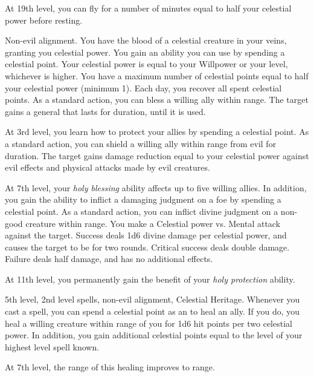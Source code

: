     At 19th level, you can fly for a number of minutes equal to half your celestial power before resting.

    \featpres Non-evil alignment.
    \featben You have the blood of a celestial creature in your veins, granting you celestial power.
    You gain an ability you can use by spending a celestial point.
    Your celestial power is equal to your Willpower or your level, whichever is higher.
    You have a maximum number of celestial points equal to half your celestial power (minimum 1).
    Each day, you recover all spent celestial points.
     As a standard action, you can bless a willing ally within \rngclose range. The target gains a general  that lasts for \durshort duration, until it is used.

    At 3rd level, you learn how to protect your allies by spending a celestial point.
     As a standard action, you can shield a willing ally within \rngmed range from evil for \durshort duration. The target gains damage reduction equal to your celestial power against evil effects and physical attacks made by evil creatures.

    At 7th level, your \textit{holy blessing} ability affects up to five willing allies.
    In addition, you gain the ability to inflict a damaging judgment on a foe by spending a celestial point.
     As a standard action, you can inflict divine judgment on a non-good creature within \rngmed range. You make a Celestial power vs. Mental attack against the target. Success deals 1d6 divine damage per celestial power, and causes the target to be \dazed for two rounds. Critical success deals double damage. Failure deals half damage, and has no additional effects.

    At 11th level, you permanently gain the benefit of your \textit{holy protection} ability.

    \featpres 5th level, 2nd level spells, non-evil alignment, Celestial Heritage.
    \featben Whenever you cast a spell, you can spend a celestial point as an  to heal an ally.
    If you do, you heal a willing creature within \rngclose range of you for 1d6 hit points per two celestial power.
    In addition, you gain additional celestial points equal to the level of your highest level spell known.

    At 7th level, the range of this healing improves to \rngmed range.

